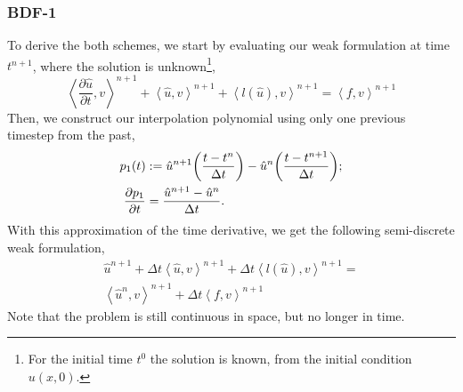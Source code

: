 \documentclass[../../thesis.tex]{subfiles}
\newcommand{\inner}[2]{\left<#1, #2\right>}
\newcommand{\dt}{\ensuremath{\Delta t}}
\begin{document}
\subsubsection{BDF-1}
To derive the both schemes, 
we start by evaluating our weak formulation at time $t^{n+1}$, 
where the solution is unknown\footnote{
    For the initial time $t^0$ the solution is known, from the initial condition
    $u(x,0)$.
},
\begin{equation}
    \inner{\frac{\partial \hat{u}}{\partial t}}{v}^{n+1}
    + \inner{\hat{u}}{v}^{n+1}
    + \inner{l(\hat{u})}{v}^{n+1}
    =  
    \inner{f}{v}^{n+1}
\end{equation}
Then, we construct our interpolation polynomial using only one previous timestep from the past, 
\begin{subequations}
\begin{align}
        p_1(t) 
        &:= 
        \hat{u}^{n+1}
        \qty(\frac{t-t^{n}}{\dt})
        - 
        \hat{u}^{n}
        \qty(\frac{t-t^{n+1}}{\dt});
        \\
        \pdv{p_1}{t} 
        &= 
        \frac{\hat{u}^{n+1} - \hat{u}^{n}}{\dt}.
    \end{align}
\end{subequations}
With this approximation of the time derivative, we get the following semi-discrete weak formulation,
\begin{align}
    \hat{u}^{n+1}
    + \dt \inner{\hat{u}}{v}^{n+1}
    + \dt \inner{l(\hat{u})}{v}^{n+1}
    =
    \nonumber \\
    \inner{\hat{u}^{n}}{v}^{n+1}
    + 
    \dt \inner{f}{v}^{n+1}
    \label{eq:bdf_1_toy_weak_formulation}
\end{align}
Note that the problem is still continuous in space, but no longer in time.
\end{document}
